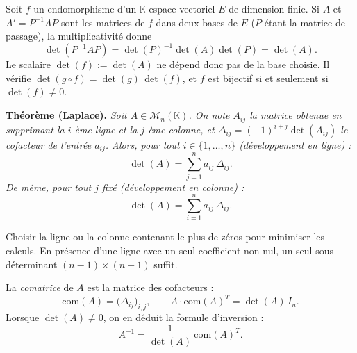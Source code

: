 Soit $f$ un endomorphisme d'un $\mathbb{K}$-espace vectoriel $E$ de dimension
finie. Si $A$ et $A' = P^{-1}AP$ sont les matrices de $f$ dans deux bases de
$E$ ($P$ étant la matrice de passage), la multiplicativité donne
\[
  \det(P^{-1}AP) = {\det(P)}^{-1}\det(A)\det(P) = \det(A).
\]
Le scalaire $\det(f) := \det(A)$ ne dépend donc pas de la base choisie.
Il vérifie $\det(g \circ f) = \det(g)\,\det(f)$, et $f$ est bijectif si et
seulement si $\det(f) \neq 0$.

\decsep{}


\begin{tcolorbox}[thmbox]
  \textbf{Théorème (Laplace).}\enspace%
  \textit{Soit $A \in \mathcal{M}_n(\mathbb{K})$. On note $A_{ij}$ la matrice
  obtenue en supprimant la $i$-ème ligne et la $j$-ème colonne, et
  $\Delta_{ij} = {(-1)}^{i+j}\det(A_{ij})$ le \emph{cofacteur} de l'entrée $a_{ij}$.
  Alors, pour tout $i \in \{1,\ldots,n\}$ (développement en ligne) :}
  \[
    \det(A) = \sum_{j=1}^{n} a_{ij}\,\Delta_{ij}.
  \]
  \textit{De même, pour tout $j$ fixé (développement en colonne) :}
  \[
    \det(A) = \sum_{i=1}^{n} a_{ij}\,\Delta_{ij}.
  \]
\end{tcolorbox}

Choisir la ligne ou la colonne contenant le plus de zéros pour minimiser les
calculs. En présence d'une ligne avec un seul coefficient non nul, un seul
sous-déterminant $(n{-}1)\times(n{-}1)$ suffit.

La \emph{comatrice} de $A$ est la matrice des cofacteurs :
\[
  \mathrm{com}(A) = \bigl(\Delta_{ij}\bigr)_{i,j},
  \qquad A \cdot {\mathrm{com}(A)}^T = \det(A)\,I_n.
\]
Lorsque $\det(A)\neq 0$, on en déduit la formule d'inversion :
\[
  A^{-1} = \frac{1}{\det(A)}\,{\mathrm{com}(A)}^T.
\]

\decsep{}


